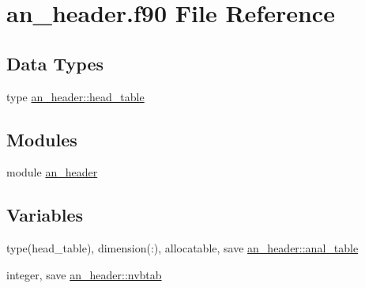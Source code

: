 \hypertarget{an__header_8f90}{}\section{an\+\_\+header.\+f90 File Reference}
\label{an__header_8f90}
\subsection*{Data Types}
\begin{DoxyCompactItemize}
\item 
type \hyperlink{structan__header_1_1head__table}{an\+\_\+header\+::head\+\_\+table}
\end{DoxyCompactItemize}
\subsection*{Modules}
\begin{DoxyCompactItemize}
\item 
module \hyperlink{namespacean__header}{an\+\_\+header}
\end{DoxyCompactItemize}
\subsection*{Variables}
\begin{DoxyCompactItemize}
\item 
type(head\+\_\+table), dimension(\+:), allocatable, save \hyperlink{namespacean__header_ae5d3cd005b4f936e39d8ca9572fad953}{an\+\_\+header\+::anal\+\_\+table}
\item 
integer, save \hyperlink{namespacean__header_a1f6702c906713337344986a86e036d55}{an\+\_\+header\+::nvbtab}
\end{DoxyCompactItemize}
